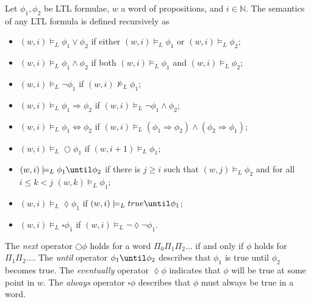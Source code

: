 \begin{defi}
Let $\phi_{1},\phi_{2}$ be LTL formulae, $w$ a word of propositions, and $i\in\mathbb{N}$. The semantics of any LTL formula is defined recursively as
\begin{itemize}
    \item{$(w,i)\models_{L}\phi_{1}\lor\phi_{2}$ if either $(w,i)\models_{L}\phi_{1}$ or $(w,i)\models_{L}\phi_{2}$;}
    \item{$(w,i)\models_{L}\phi_{1}\land\phi_{2}$ if both $(w,i)\models_{L}\phi_{1}$ and $(w,i)\models_{L}\phi_{2}$;}
    \item{$(w,i)\models_{L}\lnot\phi_{1}$ if $(w,i)\not\models_{L}\phi_{1}$;}
    \item{$(w,i)\models_{L}\phi_{1}\Rightarrow\phi_{2}$ if $(w,i)\models_{L}\lnot\phi_{1} \land \phi_{2}$;}
    \item{$(w,i)\models_{L}\phi_{1}\Leftrightarrow\phi_{2}$ if $(w,i)\models_{L}(\phi_{1}\Rightarrow\phi_{2})\land(\phi_{2}\Rightarrow\phi_{1})$;}
    \item{$(w,i)\models_{L}\bigcirc\phi_{1}$ if $(w,i+1)\models_{L}\phi_{1}$;}
    \item{$(w,i)\models_{L}\phi_{1}\until\phi_{2}$ if there is $j\geq i$ such that $(w,j)\models_{L}\phi_{2}$ and for all $i\leq k < j$ $(w,k)\models_{L}\phi_{1}$;}
    \item{$(w,i)\models_{L}\lozenge\phi_{1}$ if $(w,i)\models_{L}true\until\phi_{1}$;}
    \item{$(w,i)\models_{L}\square\phi_{1}$ if $(w,i)\models_{L}\lnot\lozenge\lnot\phi_{1}$.}
\end{itemize}
\end{defi}

The \emph{next} operator $\bigcirc\phi$ holds for a word $\Pi_{0}\Pi_{1}\Pi_{2}\ldots$ if and only if $\phi$ holds for $\Pi_{1}\Pi_{2}\ldots$. The \emph{until} operator $\phi_{1}\until\phi_{2}$ describes that $\phi_{1}$ is true until $\phi_{2}$ becomes true. The \emph{eventually} operator $\lozenge\phi$ indicates that $\phi$ will be true at some point in $w$. The \emph{always} operator $\square\phi$ describes that $\phi$ must always be true in a word.

